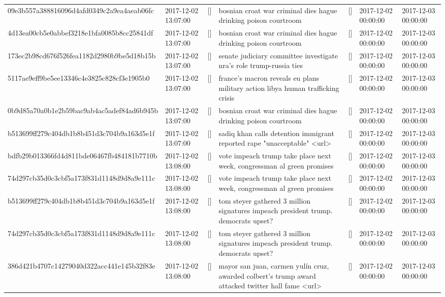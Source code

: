 \begin{tabular}{lllllll}
09e3b557a388816096d4afd0349c2a9ea4aeab06fc & 2017-12-02 13:07:00 & [] & bosnian croat war criminal dies hague drinking poison courtroom & [] & 2017-12-02 00:00:00 & 2017-12-03 00:00:00 \\
4d13ea00cb5e0abbef3218e1bfa0085b8cc25841df & 2017-12-02 13:07:00 & [] & bosnian croat war criminal dies hague drinking poison courtroom & [] & 2017-12-02 00:00:00 & 2017-12-03 00:00:00 \\
173ec2b98cd676f526fea1182d2980b9be5d18b15b & 2017-12-02 13:07:00 & [] & senate judiciary committee investigate nra's role trump-russia ties & [] & 2017-12-02 00:00:00 & 2017-12-03 00:00:00 \\
5117ae9eff9be5ee13346c4e3825c828cf3e1905b0 & 2017-12-02 13:07:00 & [] & france's macron reveals eu plans military action libya human trafficking crisis & [] & 2017-12-02 00:00:00 & 2017-12-03 00:00:00 \\
0b9d85a70a0b1e2b59bac9ab4ac5adef84ad6b945b & 2017-12-02 13:07:00 & [] & bosnian croat war criminal dies hague drinking poison courtroom & [] & 2017-12-02 00:00:00 & 2017-12-03 00:00:00 \\
b513699ff279c404db1b8b451d3c704b9a163d5e1f & 2017-12-02 13:07:00 & [] & sadiq khan calls detention immigrant reported rape "unacceptable" <url> & [] & 2017-12-02 00:00:00 & 2017-12-03 00:00:00 \\
bdfb29b013366fd4d811bde06467fb484181b7710b & 2017-12-02 13:08:00 & [] & vote impeach trump take place next week, congressman al green promises & [] & 2017-12-02 00:00:00 & 2017-12-03 00:00:00 \\
74d297cb35d0c3cbf5a173f831d1148d9d8a9e111c & 2017-12-02 13:08:00 & [] & vote impeach trump take place next week, congressman al green promises & [] & 2017-12-02 00:00:00 & 2017-12-03 00:00:00 \\
b513699ff279c404db1b8b451d3c704b9a163d5e1f & 2017-12-02 13:08:00 & [] & tom steyer gathered 3 million signatures impeach president trump. democrats upset? & [] & 2017-12-02 00:00:00 & 2017-12-03 00:00:00 \\
74d297cb35d0c3cbf5a173f831d1148d9d8a9e111c & 2017-12-02 13:08:00 & [] & tom steyer gathered 3 million signatures impeach president trump. democrats upset? & [] & 2017-12-02 00:00:00 & 2017-12-03 00:00:00 \\
386d421b4707c14279040d322acc441e145b32f83e & 2017-12-02 13:08:00 & [] & mayor san juan, carmen yulín cruz, awarded colbert's trump award attacked twitter hall fame <url> & [] & 2017-12-02 00:00:00 & 2017-12-03 00:00:00 \\

\end{tabular}
